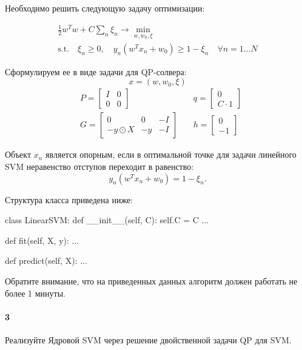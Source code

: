 \documentclass[a4paper,12pt]{article}
\begin{document}
Необходимо решить следующую задачу оптимизации:


\begin{gather}
    \frac{1}{2}w^Tw + C\sum_{n} \xi_n \to \min_{w, w_0, \xi} \\
    \text{s.t.} \quad \xi_n \ge 0, \quad y_n (w^Tx_n + w_0) \ge 1 - \xi_n \quad \forall n = 1\dots N
\end{gather}


Сформулируем ее в виде задачи для QP-солвера:
$$x = (w, w_0, \xi)$$
$$
\begin{aligned}
&P = \left[ 
    \begin{array}{c|c}
        I & 0 \\
        \hline
        0 & 0
    \end{array}
\right]
\quad
&q = \left[ 
\begin{array}{c}
    0 \\
    \hline
    C \cdot 1
\end{array}
\right] \\
&G = \left[
    \begin{array}{c|c|c}
        0 & 0 & -I \\
        \hline
        -y \odot X & -y & -I
    \end{array}
\right]
\quad
&h = \left[
    \begin{array}{c}
        0 \\
        \hline
        -1
    \end{array}
\right]
\end{aligned}
$$

Объект $x_n$ является опорным, если в оптимальной точке для задачи линейного SVM неравенство отступов переходит в равенство:
$$y_n (w^Tx_n + w_0) = 1 - \xi_n.$$


Структура класса приведена ниже:
\begin{python3}
class LinearSVM:
    def __init__(self, C):
        self.C = C
		...

    def fit(self, X, y):
        ...
    
    def predict(self, X):
        ...

\end{python3}
Обратите внимание, что на приведенных данных алгоритм должен работать не более 1 минуты.
\paragraph{3} Реализуйте Ядровой SVM через решение двойственной задачи QP для SVM.
\end{document}
